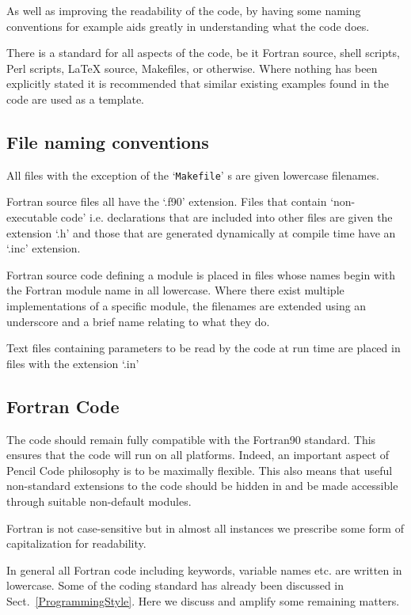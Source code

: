 \documentclass[\mydriver,12pt,twoside,notitlepage,a4paper]{article}
\makeatletter
\newcommand{\file}[2][]{%
  \def\index@{#1}%
  `\texttt{#2}'%
  \ifx\index@\@empty\index[file]{#2@\texttt{#2}}%
  \else\index[file]{#1@\texttt{#1}}%
  \fi%
}
\makeatother
\begin{document}
As well as improving the readability of the code, by having some
naming conventions for example aids greatly in understanding what
the code does.

There is a standard for all aspects of the code, be it Fortran source,
shell scripts, Perl scripts, LaTeX source, Makefiles, or otherwise.
Where nothing has been explicitly stated it is recommended that
similar existing examples found in the code are used as a template.

\subsection{File naming conventions}
All files with the exception of the \file{Makefile}s are given
lowercase filenames.

Fortran source files all have the `.f90' extension.  Files that
contain `non-executable code' i.e. declarations that are included into
other files are given the extension `.h' and those that are generated
dynamically at compile time have an `.inc' extension.

Fortran source code defining a module is placed in files whose names
begin with the Fortran module name in all lowercase.  Where there
exist multiple implementations of a specific module, the filenames
are extended using an underscore and a brief name relating
to what they do.

Text files containing parameters to be read by the code at run time are
placed in files with the extension `.in'

\subsection{Fortran Code}
\label{CodingStandards}

The code should remain fully compatible with the Fortran90 standard.
This ensures that the code will run on all platforms.
Indeed, an important aspect of {\sc Pencil Code} philosophy is to be maximally flexible.
This also means that useful non-standard extensions to the code should be hidden in and
be made accessible through suitable non-default modules.

Fortran is not case-sensitive but in almost all instances we prescribe
some form of capitalization for readability.

In general all Fortran code including keywords, variable names etc. are
written in lowercase.
Some of the coding standard has already been discussed in
Sect.~\ref{ProgrammingStyle}.
Here we discuss and amplify some remaining matters.
\end{document}
